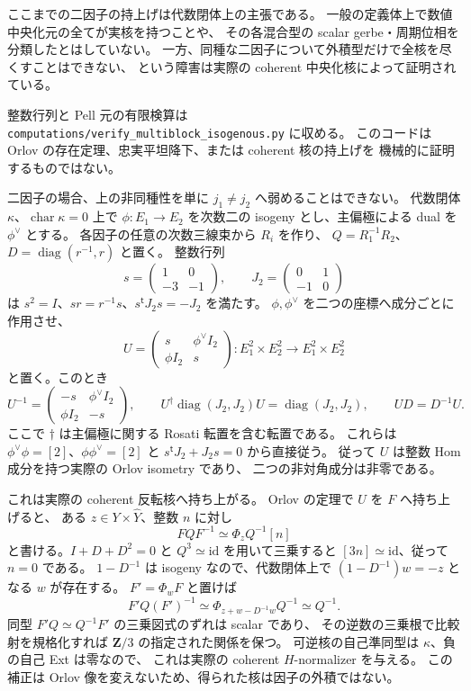 ここまでの二因子の持上げは代数閉体上の主張である。
一般の定義体上で数値中央化元の全てが実核を持つことや、
その各混合型の scalar gerbe・周期位相を分類したとはしていない。
一方、同種な二因子について外積型だけで全核を尽くすことはできない、
という障害は実際の coherent 中央化核によって証明されている。

整数行列と Pell 元の有限検算は
\texttt{computations/verify\_multiblock\_isogenous.py} に収める。
このコードは Orlov の存在定理、忠実平坦降下、または coherent 核の持上げを
機械的に証明するものではない。

\begin{example}[二次同種で生じる混合反転核]
\label{mbfc:ex:two-isogenous-inversion}
二因子の場合、上の非同種性を単に $j_1\ne j_2$ へ弱めることはできない。
代数閉体 $\kappa$、$\operatorname{char}\kappa=0$ 上で
$\phi:E_1\to E_2$ を次数二の isogeny とし、主偏極による dual を $\phi^\vee$ とする。
各因子の任意の次数三線束から $R_i$ を作り、
$Q=R_1^{-1}R_2$、$D=\operatorname{diag}(r^{-1},r)$ と置く。
整数行列
\[
 s=\begin{pmatrix}1&0\\-3&-1\end{pmatrix},\qquad
 J_2=\begin{pmatrix}0&1\\-1&0\end{pmatrix}
\]
は
$s^2=I$、$sr=r^{-1}s$、$s^{\mathsf t}J_2s=-J_2$ を満たす。
$\phi,\phi^\vee$ を二つの座標へ成分ごとに作用させ、
\begin{equation}\label{mbfc:eq:two-inversion-matrix}
 U=\begin{pmatrix}s&\phi^\vee I_2\\\phi I_2&s\end{pmatrix}
   :E_1^2\times E_2^2\longrightarrow E_1^2\times E_2^2
\end{equation}
と置く。このとき
\[
 U^{-1}=\begin{pmatrix}-s&\phi^\vee I_2\\\phi I_2&-s\end{pmatrix},
 \qquad U^\dagger\operatorname{diag}(J_2,J_2)U
          =\operatorname{diag}(J_2,J_2),\qquad UD=D^{-1}U.
\]
ここで $\dagger$ は主偏極に関する Rosati 転置を含む転置である。
これらは $\phi^\vee\phi=[2]$、$\phi\phi^\vee=[2]$ と
$s^{\mathsf t}J_2+J_2s=0$ から直接従う。
従って $U$ は整数 Hom 成分を持つ実際の Orlov isometry であり、
二つの非対角成分は非零である。

これは実際の coherent 反転核へ持ち上がる。
Orlov の定理\cite[Theorem~4.14]{MBFCOrlovAbelian}で $U$ を $F$ へ持ち上げると、
ある $z\in Y\times\widehat Y$、整数 $n$ に対し
\[
 FQF^{-1}\simeq\Phi_z Q^{-1}[n]
\]
と書ける。$I+D+D^2=0$ と $Q^3\simeq\mathrm{id}$ を用いて三乗すると
$[3n]\simeq\mathrm{id}$、従って $n=0$ である。
$1-D^{-1}$ は isogeny なので、代数閉体上で
$(1-D^{-1})w=-z$ となる $w$ が存在する。
$F'=\Phi_wF$ と置けば
\[
 F'Q(F')^{-1}\simeq\Phi_{z+w-D^{-1}w}Q^{-1}\simeq Q^{-1}.
\]
同型 $F'Q\simeq Q^{-1}F'$ の三乗図式のずれは scalar であり、
その逆数の三乗根で比較射を規格化すれば
$\mathbf Z/3$ の指定された関係を保つ。
可逆核の自己準同型は $\kappa$、負の自己 Ext は零なので、
これは実際の coherent $H$-normalizer を与える。
この補正は Orlov 像を変えないため、得られた核は因子の外積ではない。


\end{example}
